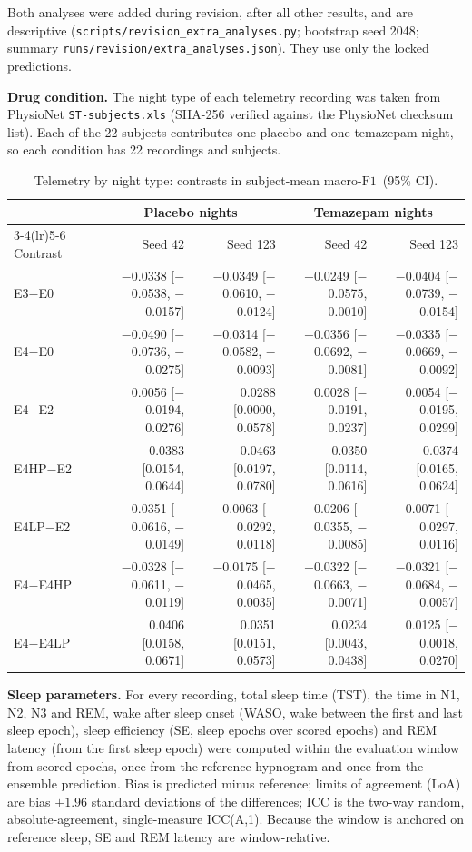 \documentclass[10pt,a4paper]{article}
\newcommand{\mf}{\ensuremath{\mathrm{macro\text{-}F1}}}
\newcommand{\ci}{95\% CI}
\begin{document}
Both analyses were added during revision, after all other results, and are descriptive
(\nolinkurl{scripts/revision_extra_analyses.py}; bootstrap seed 2048; summary
\nolinkurl{runs/revision/extra_analyses.json}). They use only the locked predictions.

\textbf{Drug condition.} The night type of each telemetry recording was taken from PhysioNet
\nolinkurl{ST-subjects.xls} (SHA-256 verified against the PhysioNet checksum list). Each of the 22 subjects contributes one
placebo and one temazepam night, so each condition has 22 recordings and subjects.

\begin{table}[H]
\centering\scriptsize
\caption{Telemetry by night type: contrasts in subject-mean \mf\ (\ci).}
\label{tab:sup_tele_night}
\begin{tabular}{llrrrr}
\toprule
& & \multicolumn{2}{c}{Placebo nights} & \multicolumn{2}{c}{Temazepam nights} \\
\cmidrule(lr){3-4}\cmidrule(lr){5-6}
Contrast & & Seed 42 & Seed 123 & Seed 42 & Seed 123 \\
\midrule
E3$-$E0 & & $-$0.0338 [$-$0.0538, $-$0.0157] & $-$0.0349 [$-$0.0610, $-$0.0124] & $-$0.0249 [$-$0.0575, 0.0010] & $-$0.0404 [$-$0.0739, $-$0.0154] \\
E4$-$E0 & & $-$0.0490 [$-$0.0736, $-$0.0275] & $-$0.0314 [$-$0.0582, $-$0.0093] & $-$0.0356 [$-$0.0692, $-$0.0081] & $-$0.0335 [$-$0.0669, $-$0.0092] \\
E4$-$E2 & & 0.0056 [$-$0.0194, 0.0276] & 0.0288 [0.0000, 0.0578] & 0.0028 [$-$0.0191, 0.0237] & 0.0054 [$-$0.0195, 0.0299] \\
E4HP$-$E2 & & 0.0383 [0.0154, 0.0644] & 0.0463 [0.0197, 0.0780] & 0.0350 [0.0114, 0.0616] & 0.0374 [0.0165, 0.0624] \\
E4LP$-$E2 & & $-$0.0351 [$-$0.0616, $-$0.0149] & $-$0.0063 [$-$0.0292, 0.0118] & $-$0.0206 [$-$0.0355, $-$0.0085] & $-$0.0071 [$-$0.0297, 0.0116] \\
E4$-$E4HP & & $-$0.0328 [$-$0.0611, $-$0.0119] & $-$0.0175 [$-$0.0465, 0.0035] & $-$0.0322 [$-$0.0663, $-$0.0071] & $-$0.0321 [$-$0.0684, $-$0.0057] \\
E4$-$E4LP & & 0.0406 [0.0158, 0.0671] & 0.0351 [0.0151, 0.0573] & 0.0234 [0.0043, 0.0438] & 0.0125 [$-$0.0018, 0.0270] \\
\bottomrule
\end{tabular}
\end{table}

\textbf{Sleep parameters.} For every recording, total sleep time (TST), the time in N1, N2, N3 and REM,
wake after sleep onset (WASO, wake between the first and last sleep epoch), sleep efficiency (SE, sleep
epochs over scored epochs) and REM latency (from the first sleep epoch) were computed within the
evaluation window from scored epochs, once from the reference hypnogram and once from the ensemble
prediction. Bias is predicted minus reference; limits of agreement (LoA) are bias $\pm1.96$ standard
deviations of the differences; ICC is the two-way random, absolute-agreement, single-measure ICC(A,1).
Because the window is anchored on reference sleep, SE and REM latency are window-relative.
\end{document}
